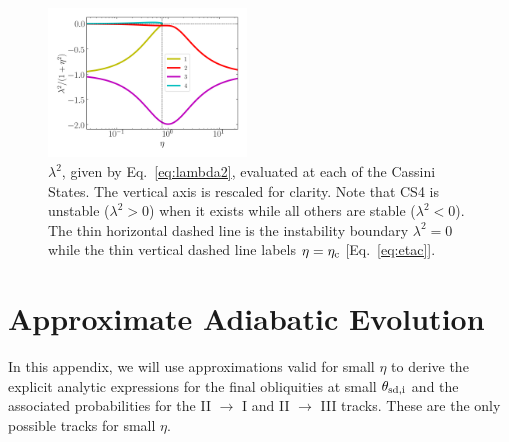 \begin{figure}
    \centering
    \includegraphics[width=0.47\textwidth]{plots_diskdisp/2_lambdas.png}
    \caption{$\lambda^2$, given by Eq.~\eqref{eq:lambda2}, evaluated at each of
    the Cassini States. The vertical axis is rescaled for clarity. Note that CS4
    is unstable ($\lambda^2 > 0$) when it exists while all others are
    stable ($\lambda^2 < 0$). The thin horizontal dashed line is the instability
    boundary $\lambda^2 = 0$ while the thin vertical dashed line labels $\eta =
    \eta_{\rm c}$ [Eq.~\eqref{eq:etac}].}\label{fig:lambda2}
\end{figure}

\section{Approximate Adiabatic Evolution}\label{s:ad_approx}

In this appendix, we will use approximations valid for small $\eta$ to derive
the explicit analytic expressions for the final obliquities at small
$\theta_{\rm sd, i}$ and the associated probabilities for the II $\to$ I and II
$\to$ III tracks. These are the only possible tracks for small $\eta$.

